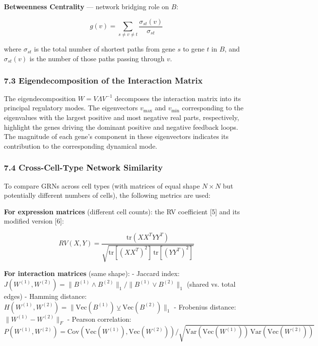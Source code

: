 \documentclass[11pt]{article}
\begin{document}
\textbf{Betweenness Centrality} — network bridging role on $B$:

\begin{equation}
g(v) = \sum_{s \neq v \neq t} \frac{\sigma_{st}(v)}{\sigma_{st}} 
\end{equation}


where $\sigma_{st}$ is the total number of shortest paths from gene $s$ to gene $t$ in $B$, and $\sigma_{st}(v)$ is the number of those paths passing through $v$.


\subsubsection*{7.3 Eigendecomposition of the Interaction Matrix}

The eigendecomposition $W = V\Lambda V^{-1}$ decomposes the interaction matrix into its principal regulatory modes. The eigenvectors $v_{\max}$ and $v_{\min}$ corresponding to the eigenvalues with the largest positive and most negative real parts, respectively, highlight the genes driving the dominant positive and negative feedback loops. The magnitude of each gene's component in these eigenvectors indicates its contribution to the corresponding dynamical mode.


\subsubsection*{7.4 Cross-Cell-Type Network Similarity}

To compare GRNs across cell types (with matrices of equal shape $N \times N$ but potentially different numbers of cells), the following metrics are used:

\textbf{For expression matrices} (different cell counts): the RV coefficient [5] and its modified version [6]:

\begin{equation}
RV(X,Y) = \frac{\mathrm{tr}(XX^TYY^T)}{\sqrt{\mathrm{tr}[(XX^T)^2]\,\mathrm{tr}[(YY^T)^2]}} 
\end{equation}


\textbf{For interaction matrices} (same shape):
- Jaccard index: $J(W^{(1)},W^{(2)}) = \|B^{(1)} \wedge B^{(2)}\|_1 / \|B^{(1)} \vee B^{(2)}\|_1$ (shared vs. total edges)
- Hamming distance: $H(W^{(1)},W^{(2)}) = \|\mathrm{Vec}(B^{(1)}) \veebar \mathrm{Vec}(B^{(2)})\|_1$
- Frobenius distance: $\|W^{(1)}-W^{(2)}\|_F$
- Pearson correlation: $P(W^{(1)},W^{(2)}) = \mathrm{Cov}(\mathrm{Vec}(W^{(1)}),\mathrm{Vec}(W^{(2)})) / \sqrt{\mathrm{Var}(\mathrm{Vec}(W^{(1)}))\,\mathrm{Var}(\mathrm{Vec}(W^{(2)}))}$
\end{document}
